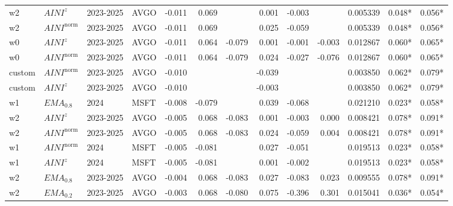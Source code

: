 \begin{longtable}{@{}llllrrrrrrrrr@{}}
w2 & $AINI^{z}$ & 2023-2025 & AVGO & -0.011 & 0.069 &  & 0.001 & -0.003 &  & 0.005339 & 0.048* & 0.056* \\
w2 & $AINI^{\mathrm{norm}}$ & 2023-2025 & AVGO & -0.011 & 0.069 &  & 0.025 & -0.059 &  & 0.005339 & 0.048* & 0.056* \\
w0 & $AINI^{z}$ & 2023-2025 & AVGO & -0.011 & 0.064 & -0.079 & 0.001 & -0.001 & -0.003 & 0.012867 & 0.060* & 0.065* \\
w0 & $AINI^{\mathrm{norm}}$ & 2023-2025 & AVGO & -0.011 & 0.064 & -0.079 & 0.024 & -0.027 & -0.076 & 0.012867 & 0.060* & 0.065* \\
custom & $AINI^{\mathrm{norm}}$ & 2023-2025 & AVGO & -0.010 &  &  & -0.039 &  &  & 0.003850 & 0.062* & 0.079* \\
custom & $AINI^{z}$ & 2023-2025 & AVGO & -0.010 &  &  & -0.003 &  &  & 0.003850 & 0.062* & 0.079* \\
w1 & $EMA_{0.8}$ & 2024 & MSFT & -0.008 & -0.079 &  & 0.039 & -0.068 &  & 0.021210 & 0.023* & 0.058* \\
w2 & $AINI^{z}$ & 2023-2025 & AVGO & -0.005 & 0.068 & -0.083 & 0.001 & -0.003 & 0.000 & 0.008421 & 0.078* & 0.091* \\
w2 & $AINI^{\mathrm{norm}}$ & 2023-2025 & AVGO & -0.005 & 0.068 & -0.083 & 0.024 & -0.059 & 0.004 & 0.008421 & 0.078* & 0.091* \\
w1 & $AINI^{\mathrm{norm}}$ & 2024 & MSFT & -0.005 & -0.081 &  & 0.027 & -0.051 &  & 0.019513 & 0.023* & 0.058* \\
w1 & $AINI^{z}$ & 2024 & MSFT & -0.005 & -0.081 &  & 0.001 & -0.002 &  & 0.019513 & 0.023* & 0.058* \\
w2 & $EMA_{0.8}$ & 2023-2025 & AVGO & -0.004 & 0.068 & -0.083 & 0.027 & -0.083 & 0.023 & 0.009555 & 0.078* & 0.091* \\
w2 & $EMA_{0.2}$ & 2023-2025 & AVGO & -0.003 & 0.068 & -0.080 & 0.075 & -0.396 & 0.301 & 0.015041 & 0.036* & 0.054* \\
\end{longtable}
